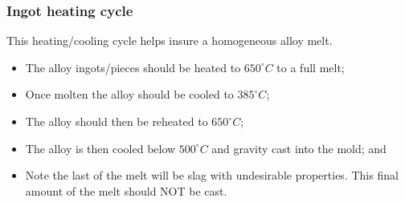 \subsubsection{Ingot heating cycle}

This heating/cooling cycle helps insure a homogeneous alloy melt.
\begin{itemize}
\item The \MgZnCa alloy ingots/pieces should be heated to $650^{\circ}C$ to a full melt;
\item Once molten the alloy should be cooled to $385^{\circ}C$;
\item The alloy should then be reheated to $650^{\circ}C$;
\item The alloy is then cooled below $500^{\circ}C$ and gravity cast into the mold; and
\item Note the last of the melt will be slag with undesirable properties. This final amount of the melt should NOT be cast.
\end{itemize}